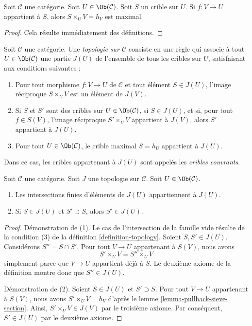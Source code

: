 \begin{lemma}
\label{lemma-pullback-sieve-section}
Soit $\mathcal{C}$ une catégorie.
Soit $U \in \Ob(\mathcal{C})$.
Soit $S$ un crible sur $U$.
Si $f : V \to U$ appartient à $S$, alors
$S \times_U V = h_V$ est maximal.
\end{lemma}

\begin{proof}
Cela résulte immédiatement des définitions.
\end{proof}

\begin{definition}
\label{definition-topology}
Soit $\mathcal{C}$ une catégorie. Une {\it topologie sur $\mathcal{C}$} consiste
en une règle qui associe à tout $U \in \Ob(\mathcal{C})$
une partie $J(U)$ de l'ensemble de tous les cribles sur $U$, satisfaisant
aux conditions suivantes :
\begin{enumerate}
\item Pour tout morphisme $f : V \to U$ de $\mathcal{C}$ et
tout élément $S \in J(U)$, l'image réciproque $S \times_U V$
est un élément de $J(V)$.
\item Si $S$ et $S'$ sont des cribles sur $U \in \Ob(\mathcal{C})$,
si $S \in J(U)$, et si, pour tout $f \in S(V)$, l'image réciproque
$S' \times_U V$ appartient à $J(V)$, alors $S'$ appartient à $J(U)$.
\item Pour tout $U \in \Ob(\mathcal{C})$, le
crible maximal $S = h_U$ appartient à $J(U)$.
\end{enumerate}
\end{definition}

\noindent
Dans ce cas, les cribles appartenant à $J(U)$ sont appelés
les {\it cribles couvrants}.

\begin{lemma}
\label{lemma-topology-basic}
Soit $\mathcal{C}$ une catégorie.
Soit $J$ une topologie sur $\mathcal{C}$.
Soit $U \in \Ob(\mathcal{C})$.
\begin{enumerate}
\item Les intersections finies d'éléments de $J(U)$ appartiennent à $J(U)$.
\item Si $S \in J(U)$ et $S' \supset S$, alors $S' \in J(U)$.
\end{enumerate}
\end{lemma}

\begin{proof}
Démonstration de (1). Le cas de l'intersection de la famille vide résulte de la condition
(3) de la définition \ref{definition-topology}.
Soient $S, S' \in J(U)$. Considérons $S'' = S \cap S'$. Pour tout
$V \to U$ appartenant à $S(V)$, nous avons
$$
S' \times_U V = S'' \times_U V
$$
simplement parce que $V \to U$ appartient déjà à $S$. Le deuxième
axiome de la définition montre donc que $S'' \in J(U)$.

\medskip\noindent
Démonstration de (2). Soient $S \in J(U)$ et $S' \supset S$. Pour tout
$V \to U$ appartenant à $S(V)$, nous avons $S' \times_U V = h_V$ d'après le
lemme \ref{lemma-pullback-sieve-section}. Ainsi,
$S' \times_U V \in J(V)$ par le troisième axiome. Par conséquent,
$S' \in J(U)$ par le deuxième axiome.
\end{proof}

